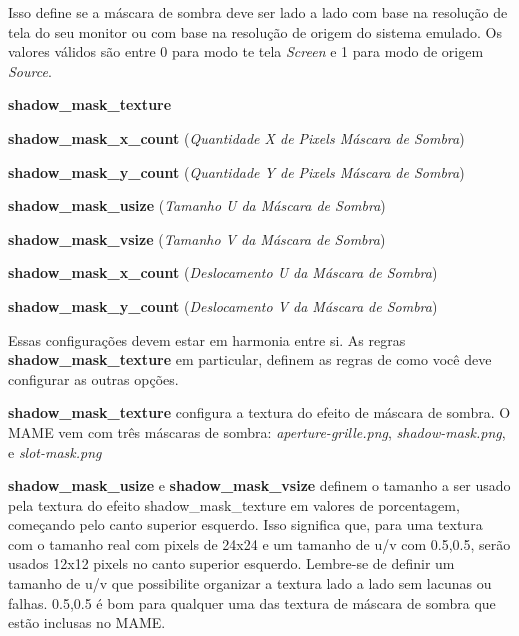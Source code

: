 \documentclass[letterpaper,10pt,brazil]{sphinxmanual}
\begin{document}
\begin{DUlineblock}{0em}
\item[]
\begin{DUlineblock}{\DUlineblockindent}
\item[] Isso define se a máscara de sombra deve ser lado a lado com base na resolução de tela do seu monitor ou com base na resolução de origem do sistema emulado. Os valores válidos são entre 0 para modo te tela \emph{Screen} e 1 para modo de origem \emph{Source}.
\item[] 
\end{DUlineblock}
\item[] \textbf{shadow\_mask\_texture}
\item[] \textbf{shadow\_mask\_x\_count} (\emph{Quantidade X de Pixels Máscara de Sombra})
\item[] \textbf{shadow\_mask\_y\_count} (\emph{Quantidade Y de Pixels Máscara de Sombra})
\item[] \textbf{shadow\_mask\_usize} (\emph{Tamanho U da Máscara de Sombra})
\item[] \textbf{shadow\_mask\_vsize} (\emph{Tamanho V da Máscara de Sombra})
\item[] \textbf{shadow\_mask\_x\_count} (\emph{Deslocamento U da Máscara de Sombra})
\item[] \textbf{shadow\_mask\_y\_count} (\emph{Deslocamento V da Máscara de Sombra})
\item[] 
\item[]
\begin{DUlineblock}{\DUlineblockindent}
\item[] Essas configurações devem estar em harmonia entre si. As regras \textbf{shadow\_mask\_texture} em particular, definem as regras de como você deve configurar as outras opções.
\item[] 
\item[] \textbf{shadow\_mask\_texture} configura a textura do efeito de máscara de sombra. O MAME vem com três máscaras de sombra: \emph{aperture-grille.png}, \emph{shadow-mask.png}, e \emph{slot-mask.png}
\item[] 
\item[] \textbf{shadow\_mask\_usize} e \textbf{shadow\_mask\_vsize} definem o tamanho a ser usado pela textura do efeito  shadow\_mask\_texture em valores de porcentagem, começando pelo canto superior esquerdo. Isso significa que, para uma textura com o tamanho real com pixels de 24x24 e um tamanho de u/v com 0.5,0.5, serão usados 12x12 pixels no canto superior esquerdo. Lembre-se de definir um tamanho de u/v que possibilite organizar a textura lado a lado sem lacunas ou falhas. 0.5,0.5 é bom para qualquer uma das textura de máscara de sombra que estão inclusas no MAME.

\end{DUlineblock}
\end{DUlineblock}
\end{document}
